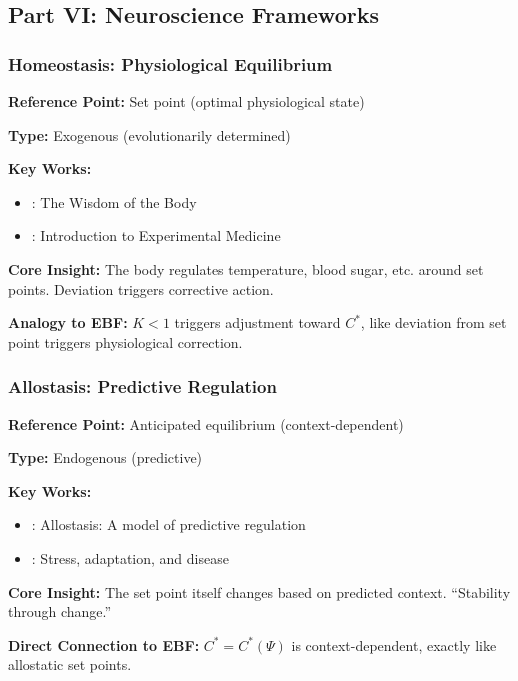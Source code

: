 
\subsection{Part VI: Neuroscience Frameworks}
\label{sec:AY-neuroscience}

\subsubsection{Homeostasis: Physiological Equilibrium}

\begin{tcolorbox}[colback=gray!5!white, colframe=gray!75!black]
\textbf{Reference Point:} Set point (optimal physiological state)

\textbf{Type:} Exogenous (evolutionarily determined)

\textbf{Key Works:}
\begin{itemize}[nosep]
    \item \citet{cannon1932}: The Wisdom of the Body
    \item \citet{bernard1865}: Introduction to Experimental Medicine
\end{itemize}

\textbf{Core Insight:}
The body regulates temperature, blood sugar, etc. around set points.
Deviation triggers corrective action.

\textbf{Analogy to EBF:}
$K < 1$ triggers adjustment toward $C^*$, like deviation from set point
triggers physiological correction.
\end{tcolorbox}

\subsubsection{Allostasis: Predictive Regulation}

\begin{tcolorbox}[colback=gray!5!white, colframe=gray!75!black]
\textbf{Reference Point:} Anticipated equilibrium (context-dependent)

\textbf{Type:} Endogenous (predictive)

\textbf{Key Works:}
\begin{itemize}[nosep]
    \item \citet{sterling2012}: Allostasis: A model of predictive regulation
    \item \citet{mcewen1998}: Stress, adaptation, and disease
\end{itemize}

\textbf{Core Insight:}
The set point itself changes based on predicted context.
``Stability through change.''

\textbf{Direct Connection to EBF:}
$C^* = C^*(\Psi)$ is context-dependent, exactly like allostatic set points.
\end{tcolorbox}

